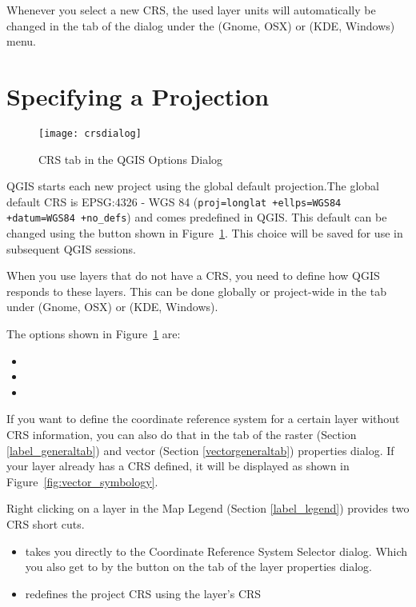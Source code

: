 Whenever you select a new CRS, the used layer units will automatically be
changed in the  tab of the
 dialog under the
 (Gnome, OSX) or  (KDE, Windows)
menu.

\section{Specifying a Projection}
\label{sec:projection-specifying}

\begin{figure}[bt]
   \centering
   \texttt{[image: crsdialog]}
   \caption{CRS tab in the QGIS Options Dialog \osxcaption}\label{fig:crsdialog}
\end{figure}

QGIS starts each new project using the global default projection.The
global default CRS is EPSG:4326 - WGS 84 (\texttt{proj=longlat
  +ellps=WGS84 +datum=WGS84 +no\_defs}) and comes predefined in
QGIS. This default can be changed using the  button shown in Figure~\ref{fig:crsdialog}. This choice
will be saved for use in subsequent QGIS sessions.

When you use layers that do not have a CRS, you need to define how
QGIS responds to these layers. This can be done globally or
project-wide in the  tab under  \arrow
{} (Gnome, OSX) or
 \arrow {}
(KDE, Windows).

The options shown in Figure~\ref{fig:crsdialog} are:
\begin{itemize}[label=--]
\item {}
\item {}
\item {}
\end{itemize}

If you want to define the coordinate reference system for a certain
layer without CRS information, you can also do that in the
 tab of the raster (Section \ref{label_generaltab}) and
vector (Section \ref{vectorgeneraltab}) properties dialog. If your
layer already has a CRS defined, it will be displayed as shown in
Figure~\ref{fig:vector_symbology}.

\begin{Tip}
\caption{\textsc{CRS in the Map Legend}} Right clicking on a layer in
the Map Legend (Section \ref{label_legend}) provides two CRS short cuts.
\begin{itemize}
\item {} takes you directly to the Coordinate
  Reference System Selector dialog. Which you also get to by the
   button on the  tab of the layer
  properties dialog.
\item {} redefines the project
  CRS using the layer's CRS
\end{itemize}
\end{Tip}

